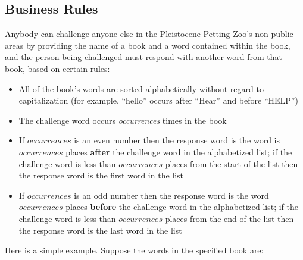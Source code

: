 \subsection{Business Rules} \label{subsec:BusinessRules}


Anybody can challenge anyone else in the Pleistocene Petting Zoo's non-public areas by providing the name of a book and a word contained within the book, and the person being challenged must respond with another word from that book, based on certain rules:
\begin{itemize}
    \item All of the book's words are sorted alphabetically without regard to capitalization (for example, ``hello'' occurs after ``Hear'' and before ``HELP'')
    \item The challenge word occurs \textit{occurrences} times in the book
    \item If $occurrences$ is an even number then the response word is the word is $occurrences$ places \textbf{after} the challenge word in the alphabetized list;
    if the challenge word is less than $occurrences$ places from the start of the list then the response word is the first word in the list
    \item If $occurrences$ is an odd number then the response word is the word $occurrences$ places \textbf{before} the challenge word in the alphabetized list;
    if the challenge word is less than $occurrences$ places from the end of the list then the response word is the last word in the list
\end{itemize}

Here is a simple example.
Suppose the words in the specified book are:

